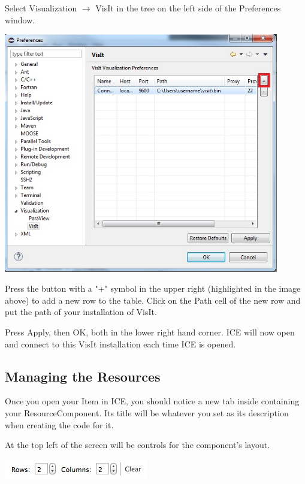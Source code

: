 \documentclass{article}
\begin{document}
Select Visualization $\rightarrow$ VisIt in the tree on the left side of the
Preferences window.

\begin{center}
\includegraphics[width=12cm]{images/VisualizationPreferences}
\end{center}

Press the button with a "+" symbol in the upper right (highlighted in the image
above) to add a new row to the table. Click on the Path cell of the new row and
put the path of your installation of VisIt.

Press Apply, then OK, both in the lower right hand corner. ICE will now open and
connect to this VisIt installation each time ICE is opened.

\subsection{Managing the Resources}

Once you open your Item in ICE, you should notice a new tab inside containing
your ResourceComponent. Its title will be whatever you set as its description
when creating the code for it.

At the top left of the screen will be controls for the component's layout.

\begin{center}
\includegraphics{images/ResourceComponentControls}
\end{center}
\end{document}
